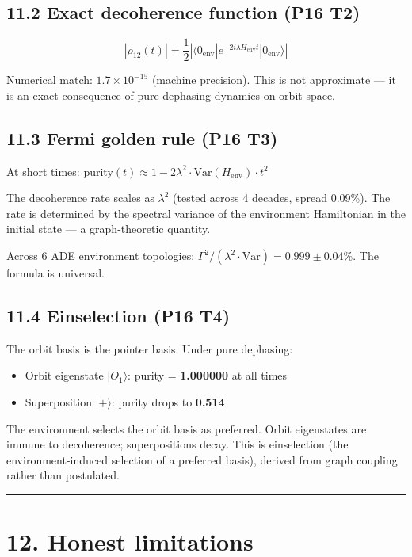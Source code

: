 \documentclass[11pt,a4paper]{article}
\providecommand{\tightlist}{\setlength{\itemsep}{0pt}\setlength{\parskip}{0pt}}
\begin{document}
\subsection*{11.2 Exact decoherence function (P16 T2)}

\[|\rho_{12}(t)| = \frac{1}{2}\left|\langle 0_{\text{env}}| e^{-2i\lambda H_{\text{env}} t} |0_{\text{env}}\rangle\right|\]

Numerical match: $1.7 \times 10^{-15}$ (machine precision). This is not approximate — it is an exact consequence of pure dephasing dynamics on orbit space.

\subsection*{11.3 Fermi golden rule (P16 T3)}

At short times: purity$(t) \approx 1 - 2\lambda^2 \cdot \text{Var}(H_{\text{env}}) \cdot t^2$

The decoherence rate scales as $\lambda^2$ (tested across 4 decades, spread 0.09\%). The rate is determined by the spectral variance of the environment Hamiltonian in the initial state — a graph-theoretic quantity.

Across 6 ADE environment topologies: $\Gamma^2 / (\lambda^2 \cdot \text{Var}) = 0.999 \pm 0.04\%$. The formula is universal.

\subsection*{11.4 Einselection (P16 T4)}

The orbit basis is the pointer basis. Under pure dephasing:
\begin{itemize}\tightlist
\item Orbit eigenstate $|O_1\rangle$: purity = \textbf{1.000000} at all times
\item Superposition $|+\rangle$: purity drops to \textbf{0.514}
\end{itemize}

The environment selects the orbit basis as preferred. Orbit eigenstates are immune to decoherence; superpositions decay. This is einselection (the environment-induced selection of a preferred basis), derived from graph coupling rather than postulated.

\begin{center}\rule{0.5\linewidth}{0.4pt}\end{center}

\section*{12. Honest limitations}
\end{document}
